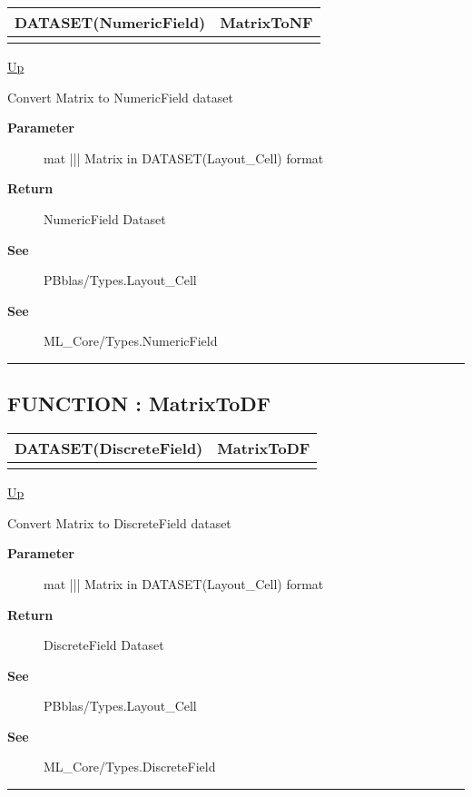 {\renewcommand{\arraystretch}{1.5}
\begin{tabularx}{\textwidth}{|>{\raggedright\arraybackslash}l|X|}
\hline
\hspace{0pt}DATASET(NumericField) & MatrixToNF \\
\hline
\multicolumn{2}{|>{\raggedright\arraybackslash}X|}{\hspace{0pt}(DATASET(Layout\_Cell) mat)} \\
\hline
\end{tabularx}
}

\hyperlink{ecldoc:PBblas.Converted}{Up}

\par
Convert Matrix to NumericField dataset

\par
\begin{description}
\item [\textbf{Parameter}] mat ||| Matrix in DATASET(Layout\_Cell) format
\item [\textbf{Return}] NumericField Dataset
\item [\textbf{See}] PBblas/Types.Layout\_Cell
\item [\textbf{See}] ML\_Core/Types.NumericField
\end{description}

\rule{\textwidth}{0.4pt}
\subsection*{FUNCTION : MatrixToDF}
\hypertarget{ecldoc:pbblas.converted.matrixtodf}{}

{\renewcommand{\arraystretch}{1.5}
\begin{tabularx}{\textwidth}{|>{\raggedright\arraybackslash}l|X|}
\hline
\hspace{0pt}DATASET(DiscreteField) & MatrixToDF \\
\hline
\multicolumn{2}{|>{\raggedright\arraybackslash}X|}{\hspace{0pt}(DATASET(Layout\_Cell) mat)} \\
\hline
\end{tabularx}
}

\hyperlink{ecldoc:PBblas.Converted}{Up}

\par
Convert Matrix to DiscreteField dataset

\par
\begin{description}
\item [\textbf{Parameter}] mat ||| Matrix in DATASET(Layout\_Cell) format
\item [\textbf{Return}] DiscreteField Dataset
\item [\textbf{See}] PBblas/Types.Layout\_Cell
\item [\textbf{See}] ML\_Core/Types.DiscreteField
\end{description}

\rule{\textwidth}{0.4pt}


